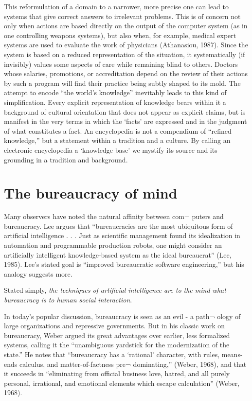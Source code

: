 \documentclass[12pt]{article}
\begin{document}
This reformulation of a domain to a narrower, more precise one can lead to systems that give correct answers to irrelevant problems. This is of concern not only when actions are based directly on the output of the computer system (as in one controlling weapons systems), but also when, for example, medical expert systems are used to evaluate the work of physicians (Athanasiou, 1987). Since the system is based on a reduced representation of the situation, it systematically (if invisibly) values some aspects of care while remaining blind to others.  Doctors whose salaries,
promotions, or accreditation depend on the review of their actions by
such a program will find their practice being subtly shaped to its mold. The attempt to encode ``the world’s knowledge'' inevitably leads to this kind of simplification. Every explicit representation of knowledge bears within it a background of cultural orientation that does not appear as explicit claims, but is manifest in the very terms in which the ‘facts’ are expressed and in the judgment of what constitutes a fact. An encyclopedia is not a compendium of ``refined knowledge,'' but a statement within a tradition and a culture. By calling an electronic encyclopedia a ‘knowledge base’ we mystify its source and its grounding in a tradition and background.

\section{The bureaucracy of mind}

Many observers have noted the natural affinity between com¬ puters and bureaucracy. Lee argues that ``bureaucracies are the most ubiquitous form of artificial intelligence . . . Just as scientific management found its idealization in automation and programmable production robots, one might consider an artificially intelligent knowledge-based system as the ideal bureaucrat'' (Lee, 1985). Lee’s stated goal is ``improved bureaucratic software engineering,'' but his analogy suggests more.

Stated simply, {\it the techniques of artificial intelligence are to the mind what bureaucracy is to human social interaction}.

In today’s popular discussion, bureaucracy is seen as an evil - a path¬ ology of large organizations and repressive governments. But in his classic work on bureaucracy, Weber argued its great advantages over earlier, less formalized systems, calling it the ``unambiguous yardstick for the modernization of the state.'' He notes that ``bureaucracy has a ‘rational’ character, with rules, means-ends calculus, and matter-of-factness pre¬ dominating,'' (Weber, 1968), and that it succeeds in ``eliminating from official business love, hatred, and all purely personal, irrational, and emotional elements which escape calculation'' (Weber, 1968).
\end{document}
